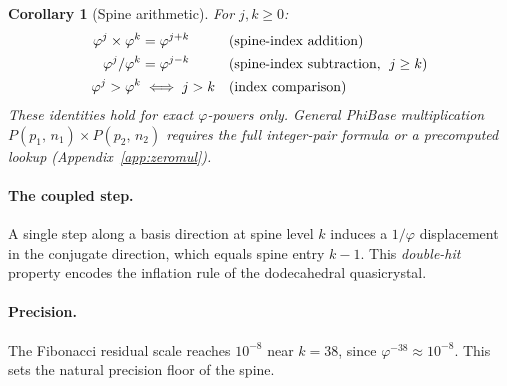 \documentclass[12pt]{article}
\newtheorem{corollary}[theorem]{Corollary}
\theoremstyle{definition}
\theoremstyle{remark}
\newcommand{\Phib}[2]{P(#1,\,#2)}
\begin{document}
\begin{corollary}[Spine arithmetic]
\label{cor:spineops}
For $j,k\geq 0$:
\begin{align}
  \varphi^j \times \varphi^k &= \varphi^{j+k}
    &&\text{(spine-index addition)} \\
  \varphi^j / \varphi^k &= \varphi^{j-k}
    &&\text{(spine-index subtraction,\; $j\geq k$)} \\
  \varphi^j > \varphi^k &\iff j > k
    &&\text{(index comparison)}
\end{align}
These identities hold for exact $\varphi$-powers only.
General PhiBase multiplication $\Phib{p_1}{n_1}\times\Phib{p_2}{n_2}$
requires the full integer-pair formula or a precomputed lookup
(Appendix~\ref{app:zeromul}).
\end{corollary}
\paragraph{The coupled step.}
A single step along a basis direction at spine level $k$ induces a
$1/\varphi$ displacement in the conjugate direction, which equals
spine entry $k-1$.  This \emph{double-hit} property encodes the
inflation rule of the dodecahedral quasicrystal.
\paragraph{Precision.}
The Fibonacci residual scale reaches $10^{-8}$ near $k=38$, since
$\varphi^{-38}\approx 10^{-8}$.  This sets the natural precision
floor of the spine.
\end{document}
